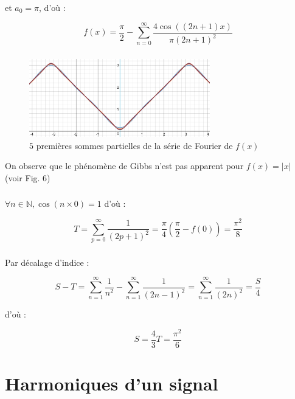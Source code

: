\documentclass{article}
\begin{document}
et $a_0 = \pi$, d'où :

$$f(x) = \frac{\pi}{2} - \sum_{n = 0}^{\infty} \frac{4 \cos((2n + 1) x)}{\pi(2n + 1)^2}$$

\subsubsection{}

\begin{figure}[ht!]
    \centering
    \includegraphics[width=0.7\textwidth]{figures/abs.png}
    \caption{$5$ premières sommes partielles de la série de Fourier de $f(x)$}
\end{figure}

On observe que le phénomène de Gibbs n'est pas apparent pour $f(x) = |x|$ (voir Fig. 6)

\subsubsection{}

$\forall n \in \mathbb{N}, \cos(n \times 0) = 1$ d'où :

$$T = \sum_{p = 0}^{\infty} \frac{1}{(2p + 1)^2} = \frac{\pi}{4} (\frac{\pi}{2} - f(0)) = \frac{\pi^2}{8}$$


\subsubsection{}

Par décalage d'indice :

$$S - T = \sum_{n = 1}^{\infty} \frac{1}{n^2} - 
\sum_{n = 1}^{\infty} \frac{1}{(2n - 1)^2} = \sum_{n = 1}^{\infty} \frac{1}{(2n)^2} = \frac{S}{4}$$

d'où :

$$S = \frac{4}{3} T = \frac{\pi^2}{6}$$

\section{Harmoniques d'un signal}

\subsection{}
\end{document}
